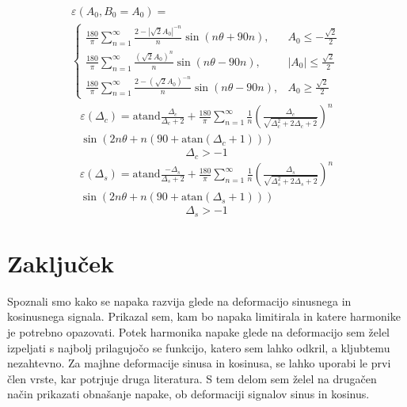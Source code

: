 \documentclass[a4paper]{article}
\begin{document}
\begin{multline}
\varepsilon(A_0,B_0=A_0)=\\
\begin{cases}
\frac{180}{\pi}\sum_{n=1}^{\infty}\frac{2-|\sqrt{2}A_0|^{-n}}{n} \sin (n \theta + 90 n), & A_0\leq -\frac{\sqrt{2}}{2} \\
\frac{180}{\pi}\sum_{n=1}^{\infty}\frac{(\sqrt{2}A_0)^n}{n} \sin (n \theta - 90 n), & |A_0|\leq \frac{\sqrt{2}}{2} \\
\frac{180}{\pi}\sum_{n=1}^{\infty}\frac{2-(\sqrt{2}A_0)^{-n}}{n} \sin (n \theta - 90 n), & A_0\geq \frac{\sqrt{2}}{2}
\end{cases}
\end{multline}
\begin{multline}
\varepsilon(\Delta_c) = \mathrm{atand}\frac{\Delta_c}{\Delta_c+2}+\frac{180}{\pi} \sum_{n=1}^{\infty}\frac{1}{n} (\frac{\Delta_c}{\sqrt{\Delta_c^2+2 \Delta_c+2}})^n\\ \sin (2n \theta+n (90+ \mathrm{ atan}(\Delta_c+1)))
\end{multline}
\begin{equation*}
\Delta_c > -1
\end{equation*}
\begin{multline}
\varepsilon(\Delta_s) = \mathrm{atand}\frac{-\Delta_s}{\Delta_s+2}+\frac{180}{\pi} \sum_{n=1}^{\infty}\frac{1}{n} (\frac{\Delta_s}{\sqrt{\Delta_s^2+2 \Delta_s+2}})^n\\ \sin (2n \theta+n (90+ \mathrm{ atan}(\Delta_s+1)))
\end{multline}
\begin{equation*}
\Delta_s > -1
\end{equation*}

\section{Zaključek}

Spoznali smo kako se napaka razvija glede na deformacijo sinusnega in kosinusnega signala. Prikazal sem, kam bo napaka limitirala in katere harmonike je potrebno opazovati. Potek harmonika napake glede na deformacijo sem želel izpeljati s najbolj prilagujočo se funkcijo, katero sem lahko odkril, a kljubtemu nezahtevno. Za majhne deformacije sinusa in kosinusa, se lahko uporabi le prvi člen vrste, kar potrjuje druga literatura. S tem delom sem želel na drugačen način prikazati obnašanje napake, ob deformaciji signalov sinus in kosinus. 
\end{document}
